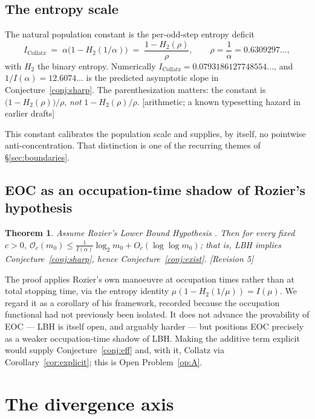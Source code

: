\documentclass[11pt]{article}
\theoremstyle{plain}
\newtheorem{theorem}{Theorem}[section]
\theoremstyle{definition}
\theoremstyle{remark}
\newcommand{\Occ}{\mathcal{O}}
\newcommand{\al}{\alpha}
\newcommand{\status}[1]{\textsf{\footnotesize[#1]}}
\begin{document}
\subsection{The entropy scale}\label{sec:entropy}

The natural population constant is the per-odd-step entropy deficit
\[
I_{\mathrm{Collatz}}\;=\;\al\bigl(1-H_2(1/\al)\bigr)\;=\;\frac{1-H_2(\rho)}{\rho},
\qquad \rho=\frac{1}{\al}=0.6309297\ldots,
\]
with $H_2$ the binary entropy. Numerically $I_{\mathrm{Collatz}}=0.0793186127748554\ldots$, and
$1/I(\al)=12.6074\ldots$ is the predicted asymptotic slope in Conjecture~\ref{conj:sharp}. The
parenthesization matters: the constant is $\bigl(1-H_2(\rho)\bigr)/\rho$, \emph{not}
$1-H_2(\rho)/\rho$. \status{arithmetic; a known typesetting hazard in earlier drafts}

This constant calibrates the population scale and supplies, by itself, no pointwise
anti-concentration. That distinction is one of the recurring themes of \S\ref{sec:boundaries}.

\subsection{EOC as an occupation-time shadow of Rozier's hypothesis}\label{sec:rozier}

\begin{theorem}\label{thm:rozier}
Assume Rozier's Lower Bound Hypothesis \cite[Hyp.~2.3]{Rozier}. Then for every fixed $c>0$,
$\Occ_c(m_0)\le \frac{1}{I(\al)}\log_2 m_0+O_c(\log\log m_0)$; that is, LBH implies
Conjecture~\ref{conj:sharp}, hence Conjecture~\ref{conj:exist}. \status{Revision 5}
\end{theorem}

The proof applies Rozier's own manoeuvre \cite[Thm.~4.1]{Rozier} at occupation times rather than at
total stopping time, via the entropy identity $\mu(1-H_2(1/\mu))=I(\mu)$. We regard it as a
corollary of his framework, recorded because the occupation functional had not previously been
isolated. It does not advance the provability of EOC --- LBH is itself open, and arguably harder ---
but positions EOC precisely as a weaker occupation-time shadow of LBH. Making the additive term
explicit would supply Conjecture~\ref{conj:eff} and, with it, Collatz via
Corollary~\ref{cor:explicit}; this is Open Problem~\ref{op:A}.

\section{The divergence axis}\label{sec:divergence}
\end{document}
